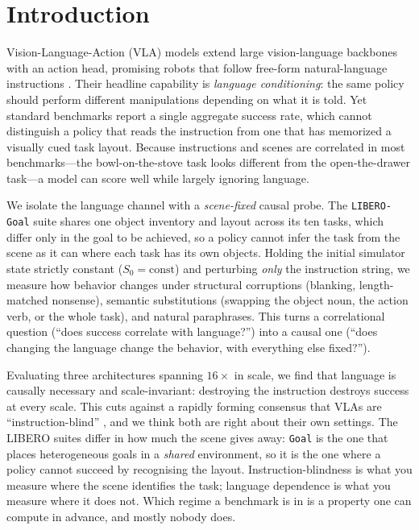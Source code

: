 \documentclass[11pt]{article}
\begin{document}
\section{Introduction}
Vision-Language-Action (VLA) models extend large vision-language backbones with an
action head, promising robots that follow free-form natural-language instructions
\citep{brohan2022rt1,brohan2023rt2,driess2023palm,kim2025openvla,shukor2025smolvla}.
Their headline capability is \emph{language conditioning}: the same policy should
perform different manipulations depending on what it is told. Yet standard
benchmarks report a single aggregate success rate, which cannot distinguish a
policy that reads the instruction from one that has memorized a visually cued task
layout. Because instructions and scenes are correlated in most benchmarks---the
bowl-on-the-stove task looks different from the open-the-drawer task---a model can
score well while largely ignoring language.

We isolate the language channel with a \emph{scene-fixed} causal probe. The
\texttt{LIBERO-Goal} suite \citep{liu2023libero} shares one object inventory and
layout across its ten tasks, which differ only in the goal to be achieved, so a
policy cannot infer the task from the scene as it can where each task has its own
objects. Holding the initial simulator state strictly constant ($S_0=\text{const}$)
and perturbing \emph{only} the instruction string, we measure how behavior changes
under structural corruptions (blanking, length-matched nonsense), semantic
substitutions (swapping the object noun, the action verb, or the whole task), and
natural paraphrases. This turns a correlational question (``does success correlate
with language?'') into a causal one (``does changing the language change the
behavior, with everything else fixed?'').

Evaluating three architectures spanning $16\times$ in scale, we find that language is
causally necessary and scale-invariant: destroying the instruction destroys success at
every scale. This cuts against a rapidly forming consensus that VLAs are
``instruction-blind''
\citep{fei2025liberoplus,zhou2025liberopro,hou2026langgap,zhang2026flatness,grant2026features},
and we think both are right about their own settings. The LIBERO suites differ in how
much the scene gives away: \texttt{Goal} is the one that places heterogeneous goals in
a \emph{shared} environment, so it is the one where a policy cannot succeed by
recognising the layout. Instruction-blindness is what you measure where the scene
identifies the task; language dependence is what you measure where it does not. Which
regime a benchmark is in is a property one can compute in advance, and mostly nobody
does.
\end{document}
